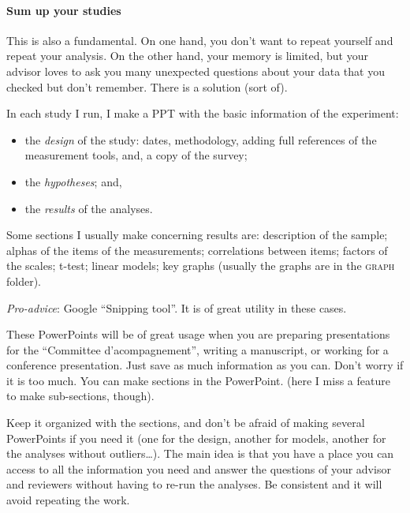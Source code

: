 \documentclass{article}
\begin{document}
\paragraph{Sum up your studies}
\label{parag: sum up}

This is also a fundamental. On one hand, you don’t want to repeat yourself and repeat your analysis. On the other hand, your memory is limited, but your advisor loves to ask you many unexpected questions about your data that you checked but don’t remember. There is a solution (sort of).

In each study I run, I make a PPT with the basic information of the experiment:
\begin{itemize}
    \item the \emph{design} of the study: dates, methodology, adding full references of the measurement tools, and, a copy of the survey;
    \item the \emph{hypotheses}; and,
    \item the \emph{results} of the analyses.
\end{itemize}	
	 
Some sections I usually make concerning results are: description of the sample; alphas of the items of the measurements; correlations between items; factors of the scales; t-test; linear models; key graphs (usually the graphs are in the \textsc{graph} folder).

\emph{Pro-advice}: Google ``Snipping tool''. It is of great utility in these cases. 

These PowerPoints will be of great usage when you are preparing presentations for the ``Committee d’acompagnement'', writing a manuscript, or working for a conference presentation. Just save as much information as you can. Don’t worry if it is too much. You can make sections in the PowerPoint. (here I miss a feature to make sub-sections, though).

Keep it organized with the sections, and don’t be afraid of making several PowerPoints if you need it (one for the design, another for models, another for the analyses without outliers…). The main idea is that you have a place you can access to all the information you need and answer the questions of your advisor and reviewers without having to re-run the analyses. Be consistent and it will avoid repeating the work. 
\end{document}
